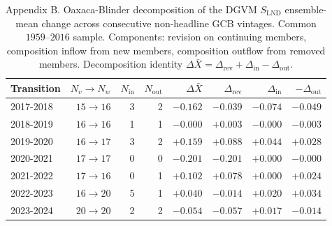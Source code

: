 \begin{table}[h]
  \centering
  \caption{Appendix B. Oaxaca-Blinder decomposition of the DGVM $S_{\mathrm{LND}}$ ensemble-mean change across consecutive non-headline GCB vintages. Common $1959$--$2016$ sample. Components: revision on continuing members, composition inflow from new members, composition outflow from removed members. Decomposition identity $\Delta \bar X = \Delta_{\mathrm{rev}} + \Delta_{\mathrm{in}} - \Delta_{\mathrm{out}}$.}
  \label{tab:appB_dgvm_lnd}
  \begin{tabular}{lrrrrrrr}
    \toprule
    Transition & $N_v\!\to\! N_w$ & $N_{\mathrm{in}}$ & $N_{\mathrm{out}}$ & $\Delta \bar X$ & $\Delta_{\mathrm{rev}}$ & $\Delta_{\mathrm{in}}$ & $-\Delta_{\mathrm{out}}$ \\
    \midrule
    2017-2018 & $15\!\to\!16$ & 3 & 2 & $-0.162$ & $-0.039$ & $-0.074$ & $-0.049$ \\
    2018-2019 & $16\!\to\!16$ & 1 & 1 & $-0.000$ & $+0.003$ & $-0.000$ & $-0.003$ \\
    2019-2020 & $16\!\to\!17$ & 3 & 2 & $+0.159$ & $+0.088$ & $+0.044$ & $+0.028$ \\
    2020-2021 & $17\!\to\!17$ & 0 & 0 & $-0.201$ & $-0.201$ & $+0.000$ & $-0.000$ \\
    2021-2022 & $17\!\to\!16$ & 0 & 1 & $+0.102$ & $+0.078$ & $+0.000$ & $+0.024$ \\
    2022-2023 & $16\!\to\!20$ & 5 & 1 & $+0.040$ & $-0.014$ & $+0.020$ & $+0.034$ \\
    2023-2024 & $20\!\to\!20$ & 2 & 2 & $-0.054$ & $-0.057$ & $+0.017$ & $-0.014$ \\
    \bottomrule
  \end{tabular}
\end{table}

